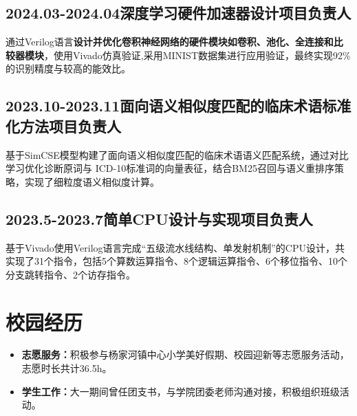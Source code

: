 \documentclass[11pt]{article}
\begin{document}
        \subsection{2024.03-2024.04\hfill 深度学习硬件加速器设计\hfill 项目负责人}
        \vspace{-0.5em}
        \hspace{2em}通过Verilog语言\textbf{设计并优化卷积神经网络的硬件模块如卷积、池化、全连接和比较器模块}，使用Vivado仿真验证,采用MINIST数据集进行应用验证，最终实现92\%的识别精度与较高的能效比。     
        \subsection{2023.10-2023.11\hfill 面向语义相似度匹配的临床术语标准化方法\hfill 项目负责人}
        \vspace{-0.5em}  
        \hspace{2em}基于SimCSE模型构建了面向语义相似度匹配的临床术语语义匹配系统，通过对比学习优化诊断原词与 ICD-10标准词的向量表征，结合BM25召回与语义重排序策略，实现了细粒度语义相似度计算。      
        \subsection{2023.5-2023.7\hfill 简单CPU设计与实现\hfill 项目负责人}
        \vspace{-0.5em} 
        \hspace{2em}基于Vivado使用Verilog语言完成“五级流水线结构、单发射机制”的CPU设计，共实现了31个指令，包括5个算数运算指令、8个逻辑运算指令、6个移位指令、10个分支跳转指令、2个访存指令。

    \vspace{0em}

    \section{\makebox[\widthof{\faSend}][c]{\color{NPU_Blue}{\faSendO}}\quad 校园经历}
    \vspace{0.5em} 
    \begin{itemize}
        \setlength{\itemsep}{0pt}  %
        \setlength{\parsep}{0pt}   %
        \setlength{\parskip}{0pt}  %
        \item \textbf{志愿服务：}积极参与杨家河镇中心小学美好假期、校园迎新等志愿服务活动，志愿时长共计36.5h。
        \item \textbf{学生工作：}大一期间曾任团支书，与学院团委老师沟通对接，积极组织班级活动。
    \end{itemize}



    \begin{figure}        \centering\scriptsize
    \end{figure}
%
\end{document}
